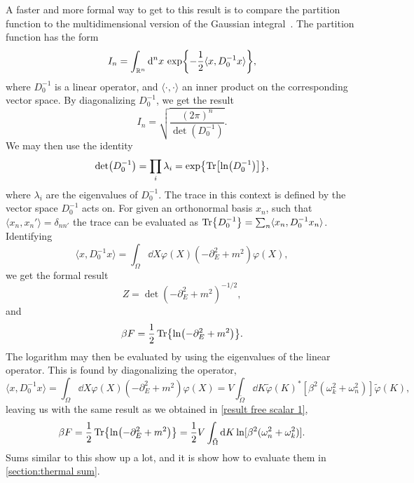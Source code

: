 A faster and more formal way to get to this result is to compare the partition function to the multidimensional version of the Gaussian integral~\cite{Kapusta:finiteTemp, Peskin:IntroQFT}.
The partition function has the form 
\begin{equation*}
    I_n = \int_{\mathbb{R}^n} \dd^n x\, \exp{- \frac{1}{2} \langle x, D_0^{-1} x\rangle },
\end{equation*}
where $D_0^{-1}$ is a linear operator, and $\langle \cdot , \cdot \rangle$ an inner product on the corresponding vector space.
By diagonalizing $D_0^{-1}$, we get the result
\begin{equation*}
    I_n = \sqrt{\frac{(2 \pi)^n}{\det(D_0^{-1})}}.
\end{equation*}
We may then use the identity
\begin{equation}
    \label{lndettrln}
    \det(D_0^{-1}) = \prod_i \lambda_i = \exp{\Tr[\ln(D_0^{-1})]},
\end{equation}
where $\lambda_i$ are the eigenvalues of $D_0^{-1}$.
The trace in this context is defined by the vector space $D_0^{-1}$ acts on.
For given an orthonormal basis $x_n$, such that $\langle x_n, x_n'\rangle = \delta_{nn'}$ the trace can be evaluated as $\Tr{D_0^{-1}} = \sum_n \langle x_n, D_0^{-1} x_n \rangle$.
Identifying 
\begin{equation*}
    \langle x, D_0^{-1} x\rangle = \int_\Omega \dd X \varphi(X)\left(-\partial_E^2+m^2\right)\varphi(X),
\end{equation*}
we get the formal result
\begin{equation*}
    Z = \det(-\partial_E^2 + m^2)^{-1/2},
\end{equation*}
and 
\begin{equation*}
    \beta F = \frac{1}{2}\Tr{\ln(-\partial_E^2 + m^2)}.
\end{equation*}
The logarithm may then be evaluated by using the eigenvalues of the linear operator.
This is found by diagonalizing the operator,
\begin{equation*}
    \langle x, D_0^{-1} x \rangle 
    = \int_\Omega \dd X \varphi(X)\left(-\partial_E^2+m^2\right)\varphi(X)
    = V  \int_{\tilde \Omega} \dd K 
    \tilde \varphi(K)^* [\beta^2(\omega_k^2 +\omega_n^2)] \tilde \varphi(K),
\end{equation*}
leaving us with the same result as we obtained in \autoref{result free scalar 1},
\begin{equation*}
    \beta F 
    = \frac{1}{2} \Tr{\ln(-\partial_E^2 + m^2)} 
    = \frac{1}{2} V \int_{\tilde \Omega} \dd K \ln[\beta^2(\omega_n^2 + \omega_k^2)].
\end{equation*}
Sums similar to this show up a lot, and it is show how to evaluate them in \autoref{section:thermal sum}.
